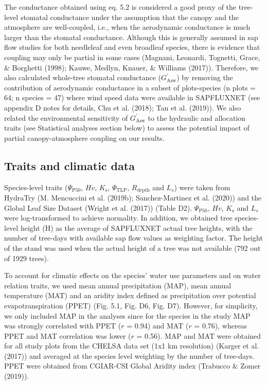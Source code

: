 \documentclass[11pt,twoside]{reedthesis}
\begin{document}
The conductance obtained using eq. 5.2 is considered a good proxy of the
tree-level stomatal conductance under the assumption that the canopy and
the atmosphere are well-coupled, i.e., when the aerodynamic conductance
is much larger than the stomatal conductance. Although this is generally
assumed in sap flow studies for both needleleaf and even broadleaf
species, there is evidence that coupling may only be partial in some
cases (Magnani, Leonardi, Tognetti, Grace, \& Borghetti (1998); Kauwe,
Medlyn, Knauer, \& Williams (2017)). Therefore, we also calculated
whole-tree stomatal conductance (\(G_{\text{Asw}}^{'}\)) by removing the
contribution of aerodynamic conductance in a subset of plots-species (n
plots = 64; n species = 47) where wind speed data were available in
SAPFLUXNET (see appendix D notes for details, Chu et al. (2018); Tan et
al. (2019)). We also related the environmental sensitivity of
\(G_{\text{Asw}}^{'}\) to the hydraulic and allocation traits (see
Statistical analyses section below) to assess the potential impact of
partial canopy-atmosphere coupling on our results.\par

\subsection{Traits and climatic data}\label{traits-and-climatic-data}

Species-level traits (\textbar{}\(\Psi_{\text{P50}}\)\textbar{}, \(Hv\),
\(K_\text{s}\), \textbar{}\(\Psi_{\text{TLP}}\)\textbar{},
\(R_{\text{depth}}\) and \(L_s\)) were taken from HydraTry (M.
Mencuccini et al. (2019b); Sanchez-Martinez et al. (2020)) and the
Global Leaf Size Dataset (Wright et al. (2017)) (Table D2).
\textbar{}\(\Psi_{\text{P50}}\)\textbar{}, \(Hv\), \(K_\text{s}\) and
\(L_s\) were log-transformed to achieve normality. In addition, we
obtained tree species-level height (H) as the average of SAPFLUXNET
actual tree heights, with the number of tree-days with available sap
flow values as weighting factor. The height of the stand was used when
the actual height of a tree was not available (792 out of 1929
trees).\par

To account for climatic effects on the species' water use parameters and
on water relation traits, we used mean annual precipitation (MAP), mean
annual temperature (MAT) and an aridity index defined as precipitation
over potential evapotranspiration (PPET) (Fig. 5.1, Fig. D6, Fig. D7).
However, for simplicity, we only included MAP in the analyses since for
the species in the study MAP was strongly correlated with PPET (\(r\) =
0.94) and MAT (\(r\) = 0.76), whereas PPET and MAT correlation was lower
(\(r\) = 0.56). MAP and MAT were obtained for all study plots from the
CHELSA data set (1x1 km resolution) (Karger et al. (2017)) and averaged
at the species level weighting by the number of tree-days. PPET were
obtained from CGIAR-CSI Global Aridity index (Trabucco \& Zomer
(2019)).\par
\end{document}

